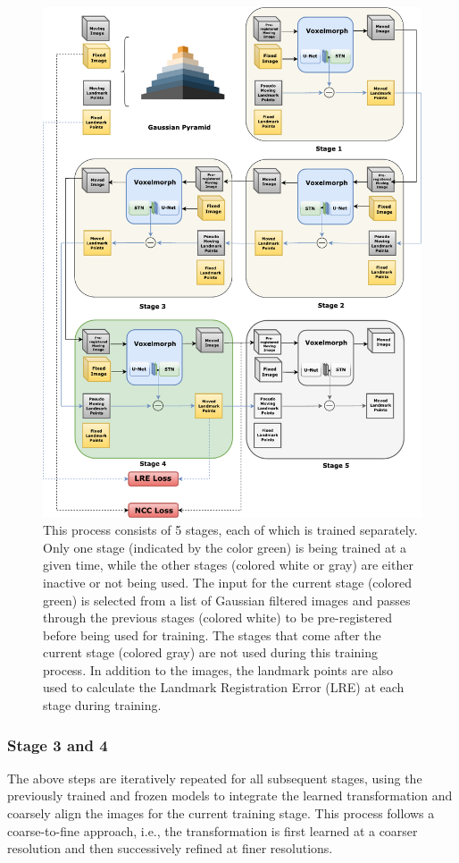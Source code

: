 \documentclass{report}
\begin{document}
	\begin{figure}[p!]
		\centering
		\includegraphics[width=\columnwidth]{resources/chapter4/methods/Method4.pdf}
		\caption{This process consists of 5 stages, each of which is trained separately. Only one stage (indicated by the color green) is being trained at a given time, while the other stages (colored white or gray) are either inactive or not being used. The input for the current stage (colored green) is selected from a list of Gaussian filtered images and passes through the previous stages (colored white) to be pre-registered before being used for training. The stages that come after the current stage (colored gray) are not used during this training process. In addition to the images, the landmark points are also used to calculate the Landmark Registration Error (LRE) at each stage during training.}
		\label{fig:block_method4}
	\end{figure}
	
	\subsubsection{Stage 3 and 4}
	The above steps are iteratively repeated for all subsequent stages, using the previously trained and frozen models to integrate the learned transformation and coarsely align the images for the current training stage. This process follows a coarse-to-fine approach, i.e., the transformation is first learned at a coarser resolution and then successively refined at finer resolutions.
	
\end{document}
